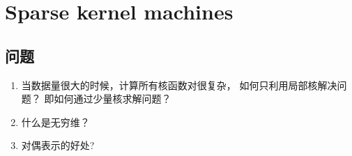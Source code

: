 \chapter{Sparse kernel machines}
\section{问题}
\begin{enumerate}
\item 当数据量很大的时候，计算所有核函数对很复杂，
如何只利用局部核解决问题？ 即如何通过少量核求解问题？
\item 什么是无穷维？
\item 对偶表示的好处?
\end{enumerate}
